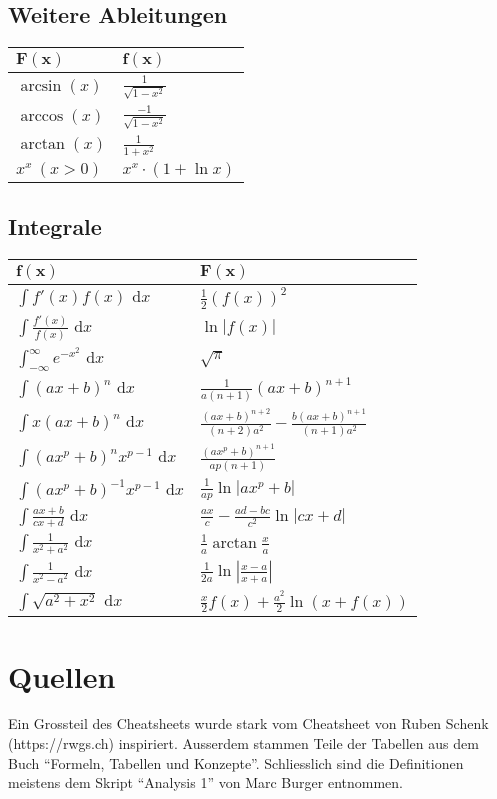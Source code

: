\documentclass[a4paper,10pt]{article}
\def\dx{\text{ d}x}
\begin{document}
\subsection{Weitere Ableitungen}
\begin{center}
  \begin{tabularx}{\linewidth}{>{\centering\arraybackslash}X>{\centering\arraybackslash}X}
  \toprule
  $\mathbf{F(x)}$ & $\mathbf{f(x)}$ \\
  \midrule
  $\arcsin(x)$ & $\frac{1}{\sqrt{1 - x^2}}$ \\
  $\arccos(x)$ & $\frac{-1}{\sqrt{1 - x^2}}$ \\
  $\arctan(x)$ & $\frac{1}{1 + x^2}$ \\ 
  $x^x \ (x > 0)$ & $x^x \cdot (1 + \ln x)$ \\
  \bottomrule
  \end{tabularx}
\end{center}
\subsection{Integrale}
\begin{center}
 \begin{tabularx}{\linewidth}{>{\centering\arraybackslash}X>{\centering\arraybackslash}X}
  \toprule
  $\mathbf{f(x)}$ & $\mathbf{F(x)}$ \\
  \midrule
  $\int f'(x) f(x) \dx$ & $\frac{1}{2}(f(x))^2$ \\
  $\int \frac{f'(x)}{f(x)} \dx$ & $\ln|f(x)|$ \\
  $\int_{-\infty}^\infty e^{-x^2} \dx$ & $\sqrt{\pi}$ \\
  $\int (ax+b)^n \dx$ & $\frac{1}{a(n+1)}(ax+b)^{n+1}$ \\
  $\int x(ax+b)^n \dx$ & $\frac{(ax+b)^{n+2}}{(n+2)a^2} - \frac{b(ax+b)^{n+1}}{(n+1)a^2}$ \\
  $\int (ax^p+b)^n x^{p-1} \dx$ & $\frac{(ax^p+b)^{n+1}}{ap(n+1)}$ \\
  $\int (ax^p + b)^{-1} x^{p-1} \dx$ & $\frac{1}{ap} \ln |ax^p + b|$ \\
  $\int \frac{ax+b}{cx+d} \dx$ & $\frac{ax}{c} - \frac{ad-bc}{c^2} \ln |cx +d|$ \\
  $\int \frac{1}{x^2+a^2} \dx$ & $\frac{1}{a} \arctan \frac{x}{a}$ \\
  $\int \frac{1}{x^2 - a^2} \dx$ & $\frac{1}{2a} \ln\left| \frac{x-a}{x+a} \right|$ \\
  $\int \sqrt{a^2+x^2} \dx $ & $\frac{x}{2}f(x) + \frac{a^2}{2}\ln(x+f(x))$ \\
  \bottomrule
 \end{tabularx}
\end{center}

\section{Quellen}
Ein Grossteil des Cheatsheets wurde stark vom Cheatsheet von Ruben Schenk (https://rwgs.ch) inspiriert. Ausserdem stammen Teile der Tabellen aus dem Buch ``Formeln, Tabellen und Konzepte''. Schliesslich sind die Definitionen meistens dem Skript ``Analysis 1'' von Marc Burger entnommen.
\end{document}
